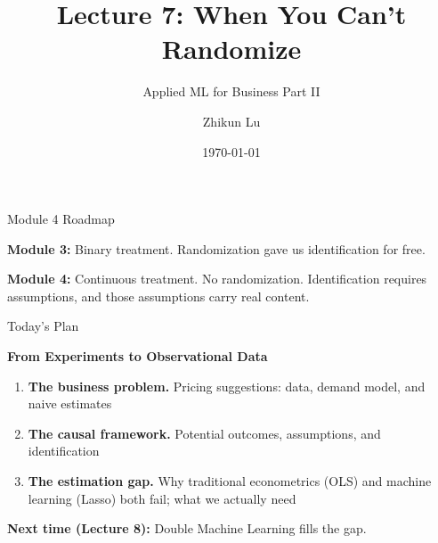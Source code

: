 \documentclass[aspectratio=169, 11pt]{beamer}
\title[Lecture 7]{Lecture 7: When You Can't Randomize}
\subtitle{Applied ML for Business Part II}
\author{Zhikun Lu}
\date{\today}
\begin{document}
\begin{frame}
\titlepage
\end{frame}

\begin{frame}{Module 4 Roadmap}

\begin{center}
\end{center}

\bigskip

\textbf{Module 3:} Binary treatment. Randomization gave us identification for free.

\smallskip

\textbf{Module 4:} Continuous treatment. No randomization. Identification requires assumptions, and those assumptions carry real content.

\end{frame}

\begin{frame}{Today's Plan}

\textbf{From Experiments to Observational Data}

\begin{enumerate}
    \item \textbf{The business problem.} Pricing suggestions: data, demand model, and naive estimates
    \item \textbf{The causal framework.} Potential outcomes, assumptions, and identification
    \item \textbf{The estimation gap.} Why traditional econometrics (OLS) and machine learning (Lasso) both fail; what we actually need
\end{enumerate}

\bigskip

\textbf{Next time (Lecture 8):} Double Machine Learning fills the gap.

\end{frame}
\end{document}
